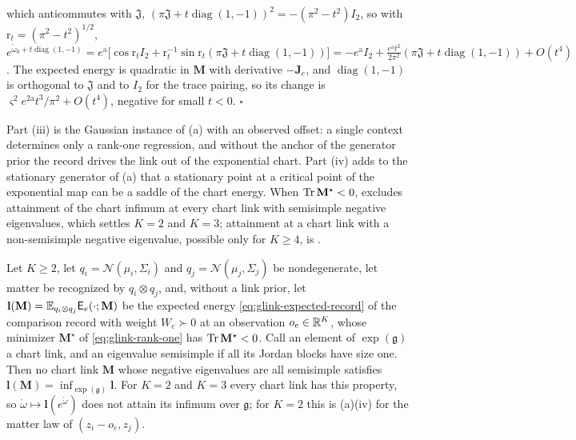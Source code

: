 which anticommutes with \(\mathfrak J\),
\((\pi\mathfrak J+t\operatorname{diag}(1,-1))^2=-(\pi^2-t^2)I_2\), so with \(\mathrm r_t=(\pi^2-t^2)^{1/2}\),
\(e^{\mathring\omega_0+t\operatorname{diag}(1,-1)}
=e^{\mathrm a}\bigl[\cos\mathrm r_tI_2+\mathrm r_t^{-1}\sin\mathrm r_t(\pi\mathfrak J+t\operatorname{diag}(1,-1))\bigr]
=-e^{\mathrm a}I_2+\tfrac{e^{\mathrm a}t^2}{2\pi^2}(\pi\mathfrak J+t\operatorname{diag}(1,-1))+O(t^4)\). The
expected energy is quadratic in \(\mathbf M\) with derivative \(-\mathbf J_e\), and
\(\operatorname{diag}(1,-1)\) is orthogonal to \(\mathfrak J\) and to \(I_2\) for the trace pairing, so
its change is \(\varsigma^2e^{2\mathrm a}t^3/\pi^2+O(t^4)\), negative for small \(t<0\).
\hfill$\square$

Part (iii) is the Gaussian instance of (a) with an observed offset: a
single context determines only a rank-one regression, and without the anchor of the generator prior the
record drives the link out of the exponential chart. Part (iv) adds to the stationary generator of
(a) that a stationary point at a critical point of the exponential map can
be a saddle of the chart energy. When \(\operatorname{Tr}\mathbf M^\star<0\),
 excludes attainment of the chart infimum at every chart link
with semisimple negative eigenvalues, which settles \(K=2\) and \(K=3\); attainment at a chart link with a
non-semisimple negative eigenvalue, possible only for \(K\geq4\), is .

Let \(K\geq2\), let \(q_i=\mathcal N(\mu_i,\Sigma_i)\) and \(q_j=\mathcal N(\mu_j,\Sigma_j)\) be
nondegenerate, let matter be recognized by \(q_i\otimes q_j\), and, without a link prior, let
\(\mathbf l(\mathbf M)=\mathbb E_{q_i\otimes q_j}\mathsf E_e(\cdot;\mathbf M)\) be the expected energy
\eqref{eq:glink-expected-record} of the comparison record with weight \(W_e\succ0\) at an observation
\(o_e\in\mathbb R^K\), whose minimizer \(\mathbf M^\star\) of \eqref{eq:glink-rank-one} has \(\operatorname{Tr}\mathbf M^\star<0\).
Call an element of \(\exp(\mathfrak g)\) a chart link, and an eigenvalue semisimple if all its Jordan
blocks have size one. Then no chart link \(\mathbf M\) whose negative eigenvalues are all semisimple
satisfies \(\mathbf l(\mathbf M)=\inf_{\exp(\mathfrak g)}\mathbf l\). For \(K=2\) and \(K=3\) every chart
link has this property, so \(\mathring\omega\mapsto\mathbf l(e^{\mathring\omega})\) does not attain its
infimum over \(\mathfrak g\); for \(K=2\) this is (a)(iv) for the matter
law of \((z_i-o_e,z_j)\). 

